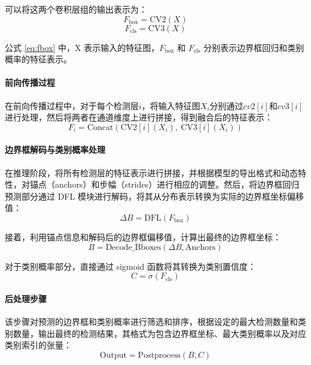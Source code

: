 \documentclass[runningheads]{llncs}
\begin{document}
可以将这两个卷积层组的输出表示为：
\begin{equation}\label{eq:fbox}
    F_\text{box} = \text{CV2}(X)
\end{equation}
\begin{equation}\label{eq:fcls}
    F_\text{cls} = \text{CV3}(X)
\end{equation}

公式 \ref{eq:fbox} 中，X 表示输入的特征图，$F_\text{box}$ 和 $F_\text{cls}$ 分别表示边界框回归和类别概率的特征表示。

\paragraph{前向传播过程}

在前向传播过程中，对于每个检测层$i$，将输入特征图$X_i$分别通过$cv2[i]$和$cv3[i]$进行处理，然后将两者在通道维度上进行拼接，得到融合后的特征表示：
\begin{equation}\label{eq:fi}
    F_i = \text{Concat}(\text{CV2}[i](X_i),\ \text{CV3}[i](X_i))
\end{equation}

\paragraph{边界框解码与类别概率处理}

在推理阶段，将所有检测层的特征表示进行拼接，并根据模型的导出格式和动态特性，对锚点（anchors）和步幅（strides）进行相应的调整。然后，将边界框回归预测部分通过 DFL 模块进行解码，将其从分布表示转换为实际的边界框坐标偏移值：
\begin{equation}\label{eq:deltab}
    \Delta B = \text{DFL}(F_{\text{box}})
\end{equation}

接着，利用锚点信息和解码后的边界框偏移值，计算出最终的边界框坐标：
\begin{equation}\label{eq:b}
    B = \text{Decode\_Bboxes}(\Delta B, \text{Anchors})
\end{equation}

对于类别概率部分，直接通过 sigmoid 函数将其转换为类别置信度：
\begin{equation}\label{eq:c}
    C = \sigma(F_{\text{cls}})
\end{equation}

\paragraph{后处理步骤}

该步骤对预测的边界框和类别概率进行筛选和排序，根据设定的最大检测数量和类别数量，输出最终的检测结果，其格式为包含边界框坐标、最大类别概率以及对应类别索引的张量：
\begin{equation}
    \text{Output} = \text{Postprocess}(B, C)
\end{equation}
\end{document}
